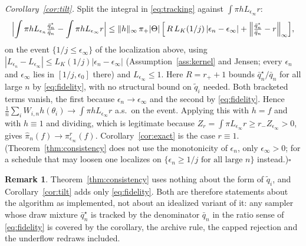 \documentclass[10pt]{article}
\theoremstyle{plain}
\theoremstyle{definition}
\newtheorem{remark}{Remark}
\begin{document}
\emph{Corollary~\ref{cor:tilt}.} Split the integral in \eqref{eq:tracking} against $\int\pi hL_{\epsilon_\infty}r$:
\[
\Bigl|\int \pi h L_{\epsilon_n}\tfrac{\bar q^\star_n}{\bar q_n}-\int\pi hL_{\epsilon_\infty}r\Bigr|
\le \|h\|_\infty\,\pi_+|\Theta|\,\Bigl[\,R\,L_K(1/j)\,|\epsilon_n-\epsilon_\infty|
+\Bigl\|\tfrac{\bar q^\star_n}{\bar q_n}-r\Bigr\|_\infty\Bigr],
\]
on the event $\{1/j\le\epsilon_\infty\}$ of the localization above, using $|L_{\epsilon_n}-L_{\epsilon_\infty}|\le L_K(1/j)|\epsilon_n-\epsilon_\infty|$ (Assumption~\ref{ass:kernel} and Jensen; every $\epsilon_n$ and $\epsilon_\infty$ lies in $[1/j,\epsilon_0]$ there) and $L_{\epsilon_\infty}\le1$. Here $R=r_++1$ bounds $\bar q^\star_n/\bar q_n$ for all large $n$ by \eqref{eq:fidelity}, with no structural bound on $\tilde q_i$ needed. Both bracketed terms vanish, the first because $\epsilon_n\to\epsilon_\infty$ and the second by \eqref{eq:fidelity}. Hence $\tfrac1n\sum_iW_{i,n}h(\theta_i)\to\int\pi hL_{\epsilon_\infty}r$ a.s.\ on the event. Applying this with $h=f$ and with $h\equiv1$ and dividing, which is legitimate because $Z_r=\int\pi L_{\epsilon_\infty}r\ge r_-Z_{\epsilon_\infty}>0$, gives $\widehat\pi_n(f)\to\pi^r_{\epsilon_\infty}(f)$. Corollary~\ref{cor:exact} is the case $r\equiv1$. (Theorem~\ref{thm:consistency} does not use the monotonicity of $\epsilon_n$, only $\epsilon_\infty>0$; for a schedule that may loosen one localizes on $\{\epsilon_n\ge1/j\text{ for all large }n\}$ instead.)\hfill$\square$

\begin{remark}\label{rem:weaker-c4}
Theorem~\ref{thm:consistency} uses nothing about the form of $\tilde q_i$, and Corollary~\ref{cor:tilt} adds only \eqref{eq:fidelity}. Both are therefore statements about the algorithm as implemented, not about an idealized variant of it: any sampler whose draw mixture $\bar q^\star_n$ is tracked by the denominator $\bar q_n$ in the ratio sense of \eqref{eq:fidelity} is covered by the corollary, the archive rule, the capped rejection and the underflow redraws included.
\end{remark}
\end{document}
